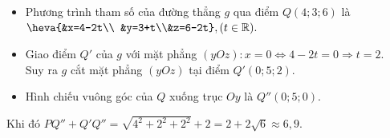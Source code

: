 \begin{bt}
{		\begin{itemize}
			\item Phương trình tham số của đường thẳng $g$ qua điểm $Q(4;3;6)$ là 
			$\heva{&x=4-2t\\  &y=3+t\\&z=6-2t},(t\in\mathbb{R}).$
			\item Giao điểm $Q'$ của $g$ với mặt  phẳng $(yOz)\colon x=0\Leftrightarrow 4-2t=0\Rightarrow t=2$.\\
			Suy ra $g$ cắt mặt phẳng $(yOz)$ tại  điểm $Q'(0;5;2)$.
			\item Hình chiếu vuông góc  của $Q$ xuống trục $Oy$ là $Q''(0;5;0)$.
		\end{itemize}
		Khi đó $PQ''+Q'Q''=\sqrt{4^2+2^2+2^2}+2=2+2\sqrt{6}\approx6{,}9$. 
	} 
\end{bt}

